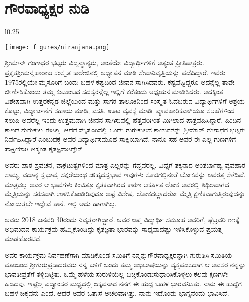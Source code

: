 {\fontsize{14}{16}\selectfont
\chapter{ಗೌರವಾಧ್ಯಕ್ಷರ ನುಡಿ}

\begin{wrapfigure}{l}{0.25\textwidth}
\centerline{\texttt{[image: figures/niranjana.png]}}
\end{wrapfigure}
ಶ್ರೀಮಾನ್ ಗಂಗಾಧರ ಭಟ್ಟರು ವಿದ್ವನ್ಮಾನ್ಯರು, ಅಂತೆಯೇ ವಿದ್ಯಾರ್ಥಿಗಳಿಗೆ ಅತ್ಯಂತ ಪ್ರೀತಿಪಾತ್ರರು. ಪ್ರಕೃತ\break ಶ್ರೀಮನ್ಮಹಾರಾಜ ಸಂಸ್ಕೃತ ಕಾಲೇಜಿನಲ್ಲಿ ಅಧ್ಯಾಪನ ಮಾಡಿ ಸೇವಾನಿವೃತ್ತಿಯನ್ನು ಪಡೆದಿದ್ದಾರೆ. ಇವರು 1975ರಲ್ಲಿಯೇ ಮೈಸೂರಿಗೆ ಬಂದು ಬಹಳ ಕಷ್ಟದಿಂದ ಜೀವನ ಸಾಗಿಸಿದವರು. ಕಷ್ಟವೆಷ್ಟಿದ್ದರೂ ಅದನ್ನೆಲ್ಲ ತಾವೇ ಜೀರ್ಣಿಸಿಕೊಂಡು ತಮ್ಮ ಕುಟುಂಬದ ಸದಸ್ಯರನ್ನೆಲ್ಲ ಇಲ್ಲಿಗೆ ಕರೆತಂದು ಅಧ್ಯಯನ ಮಾಡಿಸಿದರು. ಅದಕ್ಕಿಂತ ವಿಶೇಷವಾಗಿ ಉತ್ತರಕನ್ನಡ ಜಿಲ್ಲೆಯಿಂದ ಮತ್ತು ಸಾಗರ ತಾಲೂಕಿನಿಂದ ಸಂಸ್ಕೃತ ಓದಬರುವ ವಿದ್ಯಾರ್ಥಿಗಳಿಗೆ ಆಶ್ರಯ ಕೊಟ್ಟು, ವಿದ್ಯಾರ್ಜನೆಗೆ ಸಹಾಯ ಮಾಡಿ, ವಸತಿ, ಊಟ ವ್ಯವಸ್ಥೆ ಮಾಡಿ, ವ್ಯಾವಹಾರಿಕವಾಗಿಯೂ ಸಲಹೆ\-ಗಳಿಂದ ಸಲುಹಿ ಅವರೆಲ್ಲ ಇಂದು ಉತ್ತಮವಾಗಿ ಜೀವನ ಸಾಗಿಸುವಲ್ಲಿ ಹೆತ್ತವರಿಗಿಂತ ಮಿಗಿಲಾದ ಪಾತ್ರ\-ವಹಿಸಿದ್ದಾರೆ. ಹಿಂದಿನ ಕಾಲದ ಗುರುಕುಲ ಈಗಿಲ್ಲ. ಆದರೆ ಮೈಸೂರಿನಲ್ಲಿ ಒಂದು ಗುರುಕುಲದ ಕಾರ್ಯವನ್ನು ಶ್ರೀಮಾನ್ ಗಂಗಾಧರ ಭಟ್ಟರು ನಿರ್ವಹಿಸಿದ್ದಾರೆ ಎಂಬುದಕ್ಕೆ ಅವರ ವಿದ್ಯಾರ್ಥಿಸಮೂಹ ಸಾಕ್ಷಿಯಾಗಿದೆ. ನಾನೂ ಸಹ ಅವರ ಈ ಎಲ್ಲ ಗುಣಗಳಿಗೆ ಸಾಕ್ಷಿಯಾಗಿ ಅತ್ಯಂತ ಕೃತಜ್ಞನಾಗಿದ್ದೇನೆ.
	
ಅವರು ಪಾಠ-ಪ್ರವಚನ, ವಾಕ್ಪಟುತ್ವಗಳಿಂದ ಮಾತ್ರ ಎಲ್ಲರನ್ನು ಗೆದ್ದವರಲ್ಲ. ವಿದ್ಯೆಗೆ ತಕ್ಕನಾದ ಅಂತರ್ಬಾಹ್ಯ ವ್ಯವಹಾರ ಸಾಮ್ಯ, ವದಾನ್ಯ ಸ್ವಭಾವ, ಸಕ್ಕರೆಯಂಥ ಸೌಹೃದಸ್ವಭಾವ ಇವುಗಳು ಸೂಜಿಗಲ್ಲಿನಂತೆ ಲೋಕವನ್ನು ಅವರತ್ತ ಸೆಳೆದಿವೆ. ಮಾತ್ರವಲ್ಲ ಅವರ ಆ ಭಾವಗಳು ಕಿಂಚಿತ್ತೂ ಕೃತಕವಾಗಿರದ ಕಾರಣ ಆಕರ್ಷಿತ ಲೋಕ ಅವರಲ್ಲಿ ಶಿಥಿಲವಾಗದ ಮೈತ್ರಿಯನ್ನು ಸರಸವಾಗಿ ಉಳಿಸಿಕೊಂಡಿರಿವುದೂ ಅಷ್ಟೆ ವಿಶೇಷ. ಲೋಕದಲ್ಲಾದರೋ ಮೈತ್ರಿ ಕ್ಷಣಿಕವಾಗುತ್ತಿರುವುದನ್ನು ನೋಡುತ್ತಲೇ ಇದ್ದೇವೆ ತಾನೆ. ಇಲ್ಲಿ ಅದು ಹಾಗಾಗಿಲ್ಲ.
\eject

ಅವರು 2018 ಜನವರಿ 30ರಂದು ನಿವೃತ್ತರಾಗಿದ್ದಾರೆ. ಅವರ ಆಪ್ತ ವಿದ್ಯಾರ್ಥಿ ಸಮೂಹ ಅವರಿಗೆ, ಫೆಬ್ರವರಿ ೧೧ಕ್ಕೆ ಅಭಿವಂದನ ಕಾರ್ಯಕ್ರಮ ಹಮ್ಮಿಕೊಂಡಿದ್ದು ಕೃತಜ್ಞತಾ ಭಾರವನ್ನು ಸಾಧ್ಯವಾದಷ್ಟು ಇಳಿಸಿಕೊಳ್ಳುವ ಪ್ರಯತ್ನ ಮಾಡಹೊರಟಿದೆ. 
\vskip 4pt

ಅವರ ಕಾರ್ಯಕ್ರಮ ನಿರ್ವಹಣೆಗಾಗಿ ಮಾಡಿಕೊಂಡ ಸಮಿತಿಗೆ ನನ್ನನ್ನು\break ಗೌರವಾಧ್ಯಕ್ಷರನ್ನಾಗಿ ಗುರುತಿಸಿ ಸಮಿತಿಯ ವತಿಯಿಂದ ಶ್ರೀಗುರುಪ್ರಸಾದರವರು ನನ್ನ ಬಳಿಗೆ ಬಂದು ತಮ್ಮ ಅಭಿಲಾಷೆಯನ್ನು ವ್ಯಕ್ತಪಡಿಸಿದಾಗ ಆ ಅವಸರ ನನ್ನನ್ನು ಭಾವತೀವ್ರತೆಗೆ ತಳ್ಳಿಬಿಟ್ಟಿತು. ಒಮ್ಮೆ ಹಳೆಯ ಸುರುಳಿಯೆಲ್ಲ ಬಿಚ್ಚಿಕೊಂಡು\break ಸುಧಾರಿಸಿಕೊಳ್ಳಲು ಕೆಲವು ಕ್ಷಣಗಳೇ ಹಿಡಿದವು. ಇಷ್ಟೆಲ್ಲ ವಿದ್ವಾಂಸರ ಮಧ್ಯದಲ್ಲಿ ಚಿಕ್ಕವನಾದ ನನಗೆ ಈ ಹುದ್ದೆ ಬಹಳ ಭಾರವೆನಿಸಿತು. ನಾನು ಈ ಹುದ್ದೆಗೆ ಬಹಳ ಚಿಕ್ಕವನು ಎಂದೆ. ಆದರೆ ಅವರ ಒತ್ತಾಸೆ ಅಚಲವಾಗಿತ್ತು. ನಾನು ಇದೊಂದು ಭಾಗ್ಯವೆಂದು ಭಾವಿಸಿದೆ.
\vskip 4pt

}
